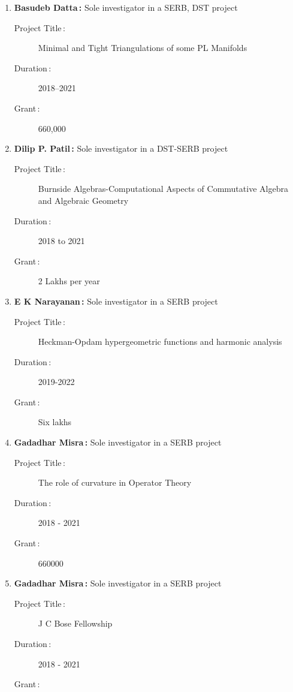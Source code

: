 \begin{enumerate}
\item {\bf Basudeb Datta\,:} Sole investigator in a SERB, DST project
\begin{description}
  \item[Project Title\,:] Minimal and Tight Triangulations of some PL Manifolds
  \item[Duration\,:] 2018--2021
  \item[Grant\,:] 660,000
\end{description}


\item {\bf Dilip P. Patil\,:} Sole investigator in a DST-SERB project
\begin{description}
  \item[Project Title\,:] Burnside Algebras-Computational Aspects of Commutative Algebra and Algebraic Geometry
  \item[Duration\,:] 2018 to 2021
  \item[Grant\,:] 2 Lakhs per year
\end{description}


\item {\bf E K Narayanan\,:} Sole investigator in a SERB project
\begin{description}
  \item[Project Title\,:] Heckman-Opdam hypergeometric functions and harmonic analysis
  \item[Duration\,:] 2019-2022
  \item[Grant\,:] Six lakhs
\end{description}


\item {\bf Gadadhar Misra\,:} Sole investigator in a SERB project
\begin{description}
  \item[Project Title\,:] The role of curvature in Operator Theory
  \item[Duration\,:] 2018 - 2021
  \item[Grant\,:] 660000
\end{description}


\item {\bf Gadadhar Misra\,:} Sole investigator in a SERB project
\begin{description}
  \item[Project Title\,:] J C Bose Fellowship
  \item[Duration\,:] 2018 - 2021
  \item[Grant\,:] 
\end{description}



\end{enumerate}
